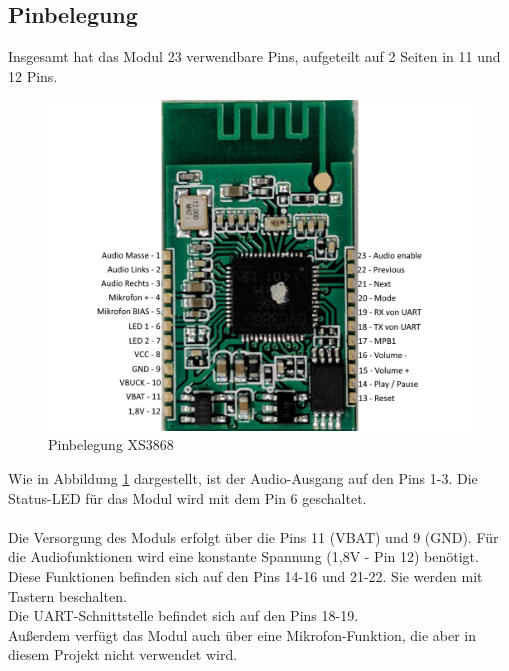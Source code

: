 \subsection{Pinbelegung} \label{subsec:4.1.5}
Insgesamt hat das Modul 23 verwendbare Pins, aufgeteilt auf 2 Seiten in 11 und 12 Pins.
\begin{figure} [H]
	\centering
	\includegraphics[width=1\textwidth]{img/BTModul/XS3868_Pinbelegung.png}
	\caption{Pinbelegung XS3868}\label {fig:4.1.5.1}
\end{figure}
Wie in Abbildung \ref{fig:4.1.5.1} dargestellt, ist der Audio-Ausgang auf den Pins 1-3. Die Status-LED für das Modul wird mit dem Pin 6 geschaltet.\\ \\
Die Versorgung des Moduls erfolgt über die Pins 11 (VBAT) und 9 (GND). Für die Audiofunktionen wird eine konstante Spannung (1,8V - Pin 12) benötigt. Diese Funktionen befinden sich auf den Pins 14-16 und 21-22. Sie werden mit Tastern beschalten.\\
Die UART-Schnittstelle befindet sich auf den Pins 18-19.\\
Außerdem verfügt das Modul auch über eine Mikrofon-Funktion, die aber in diesem Projekt nicht verwendet wird.
\newpage


